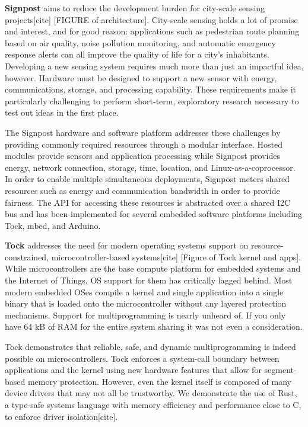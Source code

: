 \documentclass[11pt]{article} %
\begin{document}
\textbf{Signpost} aims to reduce the development burden for city-scale sensing
projects[cite] [FIGURE of architecture]. City-scale sensing holds a lot of
promise and interest, and for good reason: applications such as pedestrian
route planning based on air quality, noise pollution monitoring, and automatic
emergency response alerts can all improve the quality of life for a city's
inhabitants. Developing a new sensing system requires much more than just an
impactful idea, however. Hardware must be designed to support a new sensor with
energy, communications, storage, and processing capability. These requirements
make it particularly challenging to perform short-term, exploratory research
necessary to test out ideas in the first place.

The Signpost hardware and software platform addresses these challenges by
providing commonly required resources through a modular interface. Hosted
modules provide sensors and application processing while Signpost provides
energy, network connection, storage, time, location, and
Linux-as-a-coprocessor. In order to enable multiple simultaneous deployments,
Signpost meters shared resources such as energy and communication bandwidth in
order to provide fairness. The API for accessing these resources is abstracted
over a shared I2C bus and has been implemented for several embedded software
platforms including Tock, mbed, and Arduino.

\textbf{Tock} addresses the need for modern operating systems support on
resource-constrained, microcontroller-based systems[cite] [Figure of Tock
kernel and apps]. While microcontrollers are the base compute platform for
embedded systems and the Internet of Things, OS support for them has critically
lagged behind. Most modern embedded OSes compile a kernel and single
application into a single binary that is loaded onto the microcontroller
without any layered protection mechanisms. Support for multiprogramming is
nearly unheard of. If you only have 64 kB of RAM for the entire system sharing
it was not even a consideration.

Tock demonstrates that reliable, safe, and dynamic multiprogramming is indeed
possible on microcontrollers. Tock enforces a system-call boundary between
applications and the kernel using new hardware features that allow for
segment-based memory protection. However, even the kernel itself is composed of
many device drivers that may not all be trustworthy. We demonstrate the use of
Rust, a type-safe systems language with memory efficiency and performance close
to C, to enforce driver isolation[cite].
\end{document}
